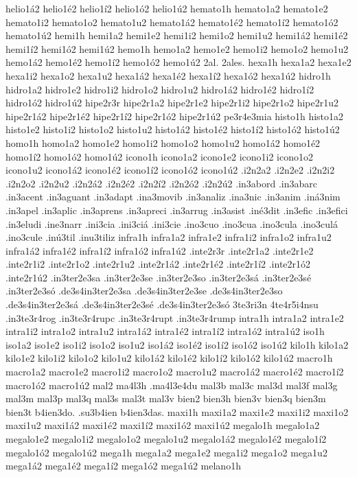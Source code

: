 {helio1á2 helio1é2 helio1í2 helio1ó2 helio1ú2
hemato1h
hemato1a2 hemato1e2 hemato1i2 hemato1o2 hemato1u2
hemato1á2 hemato1é2 hemato1í2 hemato1ó2 hemato1ú2
hemi1h
hemi1a2 hemi1e2 hemi1i2 hemi1o2 hemi1u2
hemi1á2 hemi1é2 hemi1í2 hemi1ó2 hemi1ú2
hemo1h
hemo1a2 hemo1e2 hemo1i2 hemo1o2 hemo1u2
hemo1á2 hemo1é2 hemo1í2 hemo1ó2 hemo1ú2
2al.
2ales.
hexa1h
hexa1a2 hexa1e2 hexa1i2 hexa1o2 hexa1u2
hexa1á2 hexa1é2 hexa1í2 hexa1ó2 hexa1ú2
hidro1h
hidro1a2 hidro1e2 hidro1i2 hidro1o2 hidro1u2
hidro1á2 hidro1é2 hidro1í2 hidro1ó2 hidro1ú2
hipe2r3r
hipe2r1a2 hipe2r1e2 hipe2r1i2 hipe2r1o2 hipe2r1u2
hipe2r1á2 hipe2r1é2 hipe2r1í2 hipe2r1ó2 hipe2r1ú2
pe3r4e3mia
histo1h
histo1a2 histo1e2 histo1i2 histo1o2 histo1u2
histo1á2 histo1é2 histo1í2 histo1ó2 histo1ú2
homo1h
homo1a2 homo1e2 homo1i2 homo1o2 homo1u2
homo1á2 homo1é2 homo1í2 homo1ó2 homo1ú2
icono1h
icono1a2 icono1e2 icono1i2 icono1o2 icono1u2
icono1á2 icono1é2 icono1í2 icono1ó2 icono1ú2
.i2n2a2
.i2n2e2
.i2n2i2
.i2n2o2
.i2n2u2
.i2n2á2
.i2n2é2
.i2n2í2
.i2n2ó2
.i2n2ú2
.in3abord
.in3abarc
.in3acent
.in3aguant
.in3adapt
.ina3movib
.in3analiz
.ina3nic
.in3anim
.iná3nim
.in3apel
.in3aplic
.in3aprens
.in3apreci
.in3arrug
.in3asist
.iné3dit
.in3efic
.in3efici
.in3eludi
.ine3narr
.ini3cia
.ini3ciá
.ini3cie
.ino3cuo
.ino3cua
.ino3cula
.ino3culá
.ino3cule
.inú3til
.inu3tiliz
infra1h
infra1a2 infra1e2 infra1i2 infra1o2 infra1u2
infra1á2 infra1é2 infra1í2 infra1ó2 infra1ú2
.inte2r3r
.inte2r1a2 .inte2r1e2 .inte2r1i2 .inte2r1o2 .inte2r1u2
.inte2r1á2 .inte2r1é2 .inte2r1í2 .inte2r1ó2 .inte2r1ú2
.in3ter2e3sa
.in3ter2e3se
.in3ter2e3so
.in3ter2e3sá
.in3ter2e3sé
.in3ter2e3só
.de3s4in3ter2e3sa
.de3s4in3ter2e3se
.de3s4in3ter2e3so
.de3s4in3ter2e3sá
.de3s4in3ter2e3sé
.de3s4in3ter2e3só
3te3ri3n
4te4r5i4nsu
.in3te3r4rog
.in3te3r4rupc
.in3te3r4rupt
.in3te3r4rump
intra1h
intra1a2 intra1e2 intra1i2 intra1o2 intra1u2
intra1á2 intra1é2 intra1í2 intra1ó2 intra1ú2
iso1h
iso1a2 iso1e2 iso1i2 iso1o2 iso1u2
iso1á2 iso1é2 iso1í2 iso1ó2 iso1ú2
kilo1h
kilo1a2 kilo1e2 kilo1i2 kilo1o2 kilo1u2
kilo1á2 kilo1é2 kilo1í2 kilo1ó2 kilo1ú2
macro1h
macro1a2 macro1e2 macro1i2 macro1o2 macro1u2
macro1á2 macro1é2 macro1í2 macro1ó2 macro1ú2
mal2
ma4l3h
.ma4l3e4du
mal3b
mal3c
mal3d
mal3f
mal3g
mal3m
mal3p
mal3q
mal3s
mal3t
mal3v
bien2
bien3h
bien3v
bien3q
bien3m
bien3t
b4ien3do.
.su3b4ien
b4ien3das.
maxi1h
maxi1a2 maxi1e2 maxi1i2 maxi1o2 maxi1u2
maxi1á2 maxi1é2 maxi1í2 maxi1ó2 maxi1ú2
megalo1h
megalo1a2 megalo1e2 megalo1i2 megalo1o2 megalo1u2
megalo1á2 megalo1é2 megalo1í2 megalo1ó2 megalo1ú2
mega1h
mega1a2 mega1e2 mega1i2 mega1o2 mega1u2
mega1á2 mega1é2 mega1í2 mega1ó2 mega1ú2
melano1h
}
